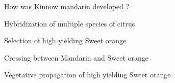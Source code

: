 \begin{questions}
\question How was Kinnow mandarin developed ?
\begin{items}
\item Hybridization of multiple species of citrus
\item Selection of high yielding Sweet orange
\item* Crossing between Mandarin and Sweet orange
\item Vegetative propagation of high yielding Sweet orange
\end{items}

\end{questions}
